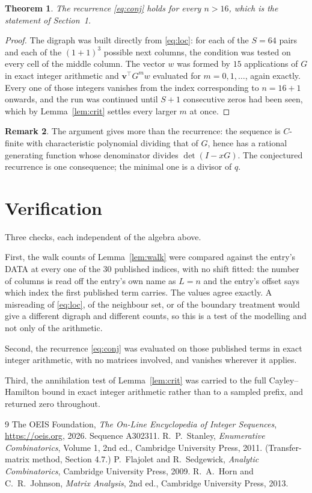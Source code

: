 \documentclass[11pt,a4paper]{article}
\theoremstyle{plain}
\newtheorem{theorem}{Theorem}
\theoremstyle{definition}
\newtheorem{remark}[theorem]{Remark}
\begin{document}
\begin{theorem}
The recurrence \eqref{eq:conj} holds for every $n>16$, which is the statement of
Section~1.
\end{theorem}

\begin{proof}
The digraph was built directly from \eqref{eq:loc}: for each of the $S=64$ pairs and each
of the $(1+1)^{3}$ possible next columns, the condition was tested on every cell of
the middle column. The vector $w$ was formed by $15$ applications of $G$ in exact integer
arithmetic and $\mathbf{v}^{\!\top}G^{m}w$ evaluated for $m=0,1,\dots$, again exactly.
Every one of those integers vanishes from the index corresponding to $n=16+1$ onwards,
and the run was continued until $S+1$ consecutive zeros had been seen, which by
Lemma~\ref{lem:crit} settles every larger $m$ at once.
\end{proof}

\begin{remark}
The argument gives more than the recurrence: the sequence is $C$-finite with characteristic
polynomial dividing that of $G$, hence has a rational generating function whose denominator
divides $\det(I-xG)$. The conjectured recurrence is one consequence; the minimal one is a
divisor of $q$.
\end{remark}

\section{Verification}

Three checks, each independent of the algebra above.

First, the walk counts of Lemma~\ref{lem:walk} were compared against the entry's DATA at
every one of the $30$ published indices, with no shift fitted: the number of columns is
read off the entry's own name as $L=n$ and the entry's offset says which index the first
published term carries. The values agree exactly. A misreading of \eqref{eq:loc}, of the
neighbour set, or of the boundary treatment would give a different digraph and different
counts, so this is a test of the modelling and not only of the arithmetic.

Second, the recurrence \eqref{eq:conj} was evaluated on those published terms in exact
integer arithmetic, with no matrices involved, and vanishes wherever it applies.

Third, the annihilation test of Lemma~\ref{lem:crit} was carried to the full
Cayley--Hamilton bound in exact integer arithmetic rather than to a sampled prefix, and
returned zero throughout.

\begin{thebibliography}{9}
 The OEIS Foundation, \emph{The On-Line Encyclopedia of Integer
Sequences}, \url{https://oeis.org}, 2026. Sequence A302311.
 R.~P.~Stanley, \emph{Enumerative Combinatorics}, Volume 1, 2nd ed.,
Cambridge University Press, 2011. (Transfer-matrix method, Section 4.7.)
 P.~Flajolet and R.~Sedgewick, \emph{Analytic Combinatorics}, Cambridge
University Press, 2009.
 R.~A.~Horn and C.~R.~Johnson, \emph{Matrix Analysis}, 2nd ed., Cambridge
University Press, 2013.
\end{thebibliography}
\end{document}
